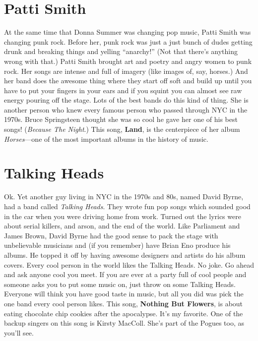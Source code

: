 \documentclass[letterpaper,single]{article}
\begin{document}
\section{Patti Smith}
At the same time that Donna Summer was changing pop music, Patti Smith was changing punk rock. 
Before her, punk rock was just a just bunch of dudes getting drunk and breaking things and yelling ``anarchy!'' (Not that there's anything wrong with that.) 
Patti Smith brought art and poetry and angry women to punk rock. 
Her songs are intense and full of imagery (like images of, say, horses.) 
And her band does the awesome thing where they start off soft and build up until you have to put your fingers in your ears and if you squint you can almost see raw energy pouring off the stage. 
Lots of the best bands do this kind of thing.
She is another person who knew every famous person who passed through NYC in the 1970s. 
Bruce Springsteen thought she was so cool he gave her one of his best songs! (\emph{Because The Night}.) This song, \textbf{Land}, is the centerpiece of her album \emph{Horses}---one of the most important albums in the history of music.

\section{Talking Heads}
Ok. Yet another guy living in NYC in the 1970s and 80s, named David Byrne, had a band called \emph{Talking Heads}. 
They wrote fun pop songs which sounded good in the car when you were driving home from work. 
Turned out the lyrics were about serial killers, and arson, and the end of the world. 
Like Parliament and James Brown, David Byrne had the good sense to pack the stage with unbelievable musicians and (if you remember) have Brian Eno produce his albums. 
He topped it off by having awesome designers and artists do his album covers. 
Every cool person in the world likes the Talking Heads. 
No joke. 
Go ahead and ask anyone cool you meet. 
If you are ever at a party full of cool people and someone asks you to put some music on, just throw on some Talking Heads. 
Everyone will think you have good taste in music, but all you did was pick the one band every cool person likes. 
This song, \textbf{Nothing But Flowers}, is about eating chocolate chip cookies after the apocalypse. It's my favorite. 
One of the backup singers on this song is Kirsty MacColl. She's part of the Pogues too, as you'll see.
\end{document}
